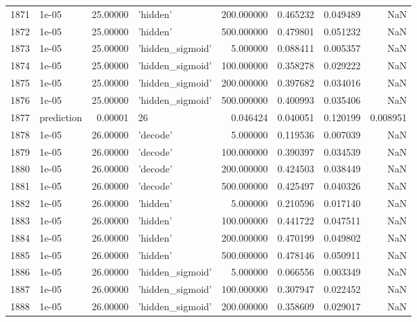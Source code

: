\documentclass[10pt,a4paper]{article}
\begin{document}
\begin{tabular}{llrlrrrr}
1871 &       1e-05 &  25.00000 &           'hidden' &  200.000000 &  0.465232 &  0.049489 &       NaN \\
1872 &       1e-05 &  25.00000 &           'hidden' &  500.000000 &  0.479801 &  0.051232 &       NaN \\
1873 &       1e-05 &  25.00000 &   'hidden\_sigmoid' &    5.000000 &  0.088411 &  0.005357 &       NaN \\
1874 &       1e-05 &  25.00000 &   'hidden\_sigmoid' &  100.000000 &  0.358278 &  0.029222 &       NaN \\
1875 &       1e-05 &  25.00000 &   'hidden\_sigmoid' &  200.000000 &  0.397682 &  0.034016 &       NaN \\
1876 &       1e-05 &  25.00000 &   'hidden\_sigmoid' &  500.000000 &  0.400993 &  0.035406 &       NaN \\
1877 &  prediction &   0.00001 &                 26 &    0.046424 &  0.040051 &  0.120199 &  0.008951 \\
1878 &       1e-05 &  26.00000 &           'decode' &    5.000000 &  0.119536 &  0.007039 &       NaN \\
1879 &       1e-05 &  26.00000 &           'decode' &  100.000000 &  0.390397 &  0.034539 &       NaN \\
1880 &       1e-05 &  26.00000 &           'decode' &  200.000000 &  0.424503 &  0.038449 &       NaN \\
1881 &       1e-05 &  26.00000 &           'decode' &  500.000000 &  0.425497 &  0.040326 &       NaN \\
1882 &       1e-05 &  26.00000 &           'hidden' &    5.000000 &  0.210596 &  0.017140 &       NaN \\
1883 &       1e-05 &  26.00000 &           'hidden' &  100.000000 &  0.441722 &  0.047511 &       NaN \\
1884 &       1e-05 &  26.00000 &           'hidden' &  200.000000 &  0.470199 &  0.049802 &       NaN \\
1885 &       1e-05 &  26.00000 &           'hidden' &  500.000000 &  0.478146 &  0.050911 &       NaN \\
1886 &       1e-05 &  26.00000 &   'hidden\_sigmoid' &    5.000000 &  0.066556 &  0.003349 &       NaN \\
1887 &       1e-05 &  26.00000 &   'hidden\_sigmoid' &  100.000000 &  0.307947 &  0.022452 &       NaN \\
1888 &       1e-05 &  26.00000 &   'hidden\_sigmoid' &  200.000000 &  0.358609 &  0.029017 &       NaN \\

\end{tabular}
\end{document}
